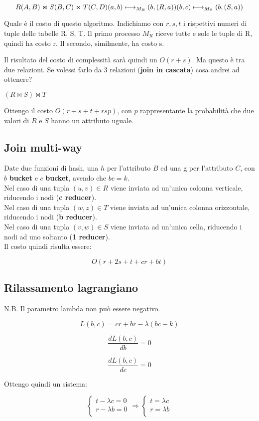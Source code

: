 \documentclass[\main/main.tex]{subfiles}
\begin{document}
\[
	R(A,B) \Join S(B,C) \Join T(C,D) \\
	(a, b) \longmapsto_{M_R} (b, (R,a))\\
	(b, c) \longmapsto_{M_S} (b, (S,a))\\
\]

Quale è il costo di questo algoritmo.
Indichiamo con $r, s, t$ i rispettivi numeri di tuple delle tabelle R, S, T.
Il primo processo $M_R$ riceve tutte e sole le tuple di R, quindi ha costo r. Il secondo, similmente, ha costo s.

Il risultato del costo di complessità sarà quindi un $O(r+s)$. Ma questo è tra due relazioni. Se volessi farlo da 3 relazioni (\textbf{join in cascata}) cosa andrei ad ottenere?

$(R \Join S) \Join T$

Ottengo il costo $O(r+s+t+rsp)$, con $p$ rappresentante la probabilità che due valori di $R$ e $S$ hanno un attributo uguale.

\subsection{Join multi-way}
Date due funzioni di hash, una $h$ per l'attributo $B$ ed una g per l'attributo $C$, con $b$ \textbf{bucket} e $c$ \textbf{bucket}, avendo che $bc = k$.
\\
Nel caso di una tupla $(u,v) \in R$ viene inviata ad un'unica colonna verticale, riducendo i nodi (\textbf{c reducer}).
\\
Nel caso di una tupla $(w,z) \in T$ viene inviata ad un'unica colonna orizzontale, riducendo i nodi (\textbf{b reducer}).
\\
Nel caso di una tupla $(v,w) \in S$ viene inviata ad un'unica cella, riducendo i nodi ad uno soltanto (\textbf{1 reducer}).
\\
Il costo quindi risulta essere:

\[
	O(r+2s+t+cr+bt)
\]

\subsection{Rilassamento lagrangiano}
N.B. Il parametro lambda non può essere negativo.

\[
	L(b,c) = cr+br - \lambda(bc-k)
\]

\[
	\dfrac{dL(b,c)}{db} = 0
\]

\[
	\dfrac{dL(b,c)}{dc} = 0
\]

Ottengo quindi un sistema:

\[
	\begin{cases}
		t - \lambda c = 0 \\
		r - \lambda b = 0 \\
	\end{cases}
	\Longrightarrow
	\begin{cases}
		t = \lambda c \\
		r = \lambda b \\
	\end{cases}
\]
\end{document}
